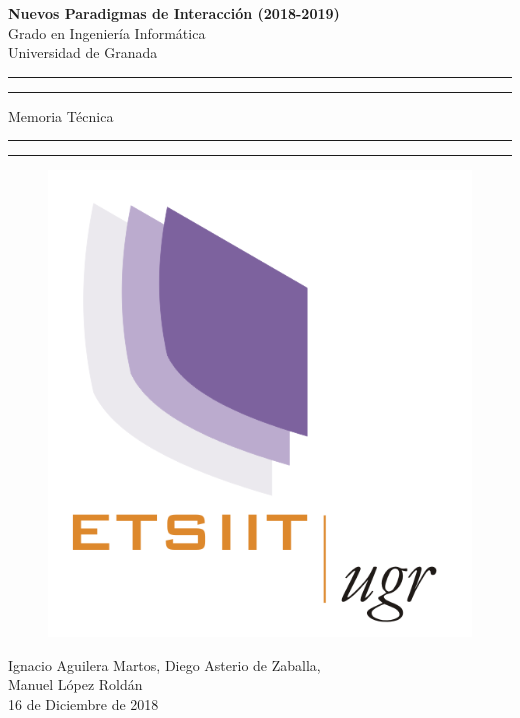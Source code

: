 \documentclass[a4paper,11pt]{article}
\begin{document}
	\begin{center}
		\LARGE{\textbf{Nuevos Paradigmas de Interacción (2018-2019)} \\ Grado en Ingeniería Informática \\ Universidad de Granada }
		\vspace*{2.5cm}

		\rule{\textwidth}{1.6pt}\vspace*{-\baselineskip}\vspace*{4pt}
		\rule{\textwidth}{1.6pt}\vspace*{-\baselineskip}\vspace*{2pt}
		\vspace{0.5cm}

		\Huge{Memoria Técnica}

		\vspace{0.5cm}
		\rule{\textwidth}{1.6pt}\vspace*{-\baselineskip}\vspace*{2pt}
		\rule{\textwidth}{1.6pt}\vspace*{-\baselineskip}\vspace*{4pt}

		\vspace{2cm}

\begin{figure}[h!]
	\centering
	\includegraphics[scale=1]{./Imagenes/logo_informatica.png}
	\label{fig:logougrciencias}
\end{figure}

		\vspace{4cm}
		\LARGE{Ignacio Aguilera Martos, Diego Asterio de Zaballa,\\ Manuel López Roldán \\ 16 de Diciembre de 2018 }

	\end{center}




\newpage

\tableofcontents

\newpage
\end{document}
